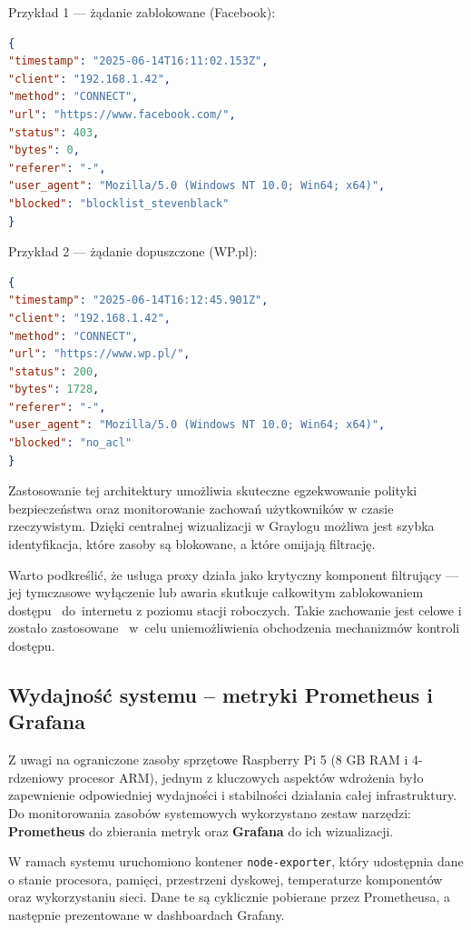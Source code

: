 \documentclass[
    left=2.5cm,         %
    right=2.5cm,        %
    top=2.5cm,          %
    bottom=3cm,         %
    bindingoffset=6mm,  %
    nohyphenation=true %
]{eiti/eiti-thesis} %
\begin{document}
Przykład 1 — żądanie zablokowane (Facebook):
\begin{lstlisting}[language=json, caption={Zablokowane żądanie HTTPS do Facebooka – dopasowane do reguły}, label={lst:squid-facebook-block}]
{
"timestamp": "2025-06-14T16:11:02.153Z",
"client": "192.168.1.42",
"method": "CONNECT",
"url": "https://www.facebook.com/",
"status": 403,
"bytes": 0,
"referer": "-",
"user_agent": "Mozilla/5.0 (Windows NT 10.0; Win64; x64)",
"blocked": "blocklist_stevenblack"
}
\end{lstlisting}

\newpage
Przykład 2 — żądanie dopuszczone (WP.pl):
\begin{lstlisting}[language=json, caption={Dostępne żądanie do portalu informacyjnego \texttt{wp.pl} – brak dopasowania ~do~ACL}, label={lst:squid-wp-noacl}]
{
"timestamp": "2025-06-14T16:12:45.901Z",
"client": "192.168.1.42",
"method": "CONNECT",
"url": "https://www.wp.pl/",
"status": 200,
"bytes": 1728,
"referer": "-",
"user_agent": "Mozilla/5.0 (Windows NT 10.0; Win64; x64)",
"blocked": "no_acl"
}
\end{lstlisting}

Zastosowanie tej architektury umożliwia skuteczne egzekwowanie polityki bezpieczeństwa oraz monitorowanie zachowań użytkowników w czasie rzeczywistym. 
Dzięki centralnej wizualizacji w Graylogu możliwa jest szybka identyfikacja, które zasoby są blokowane, a które omijają filtrację.

Warto podkreślić, że usługa proxy działa jako krytyczny komponent filtrujący — jej tymczasowe wyłączenie lub awaria skutkuje całkowitym zablokowaniem dostępu 
~do~internetu z poziomu stacji roboczych. Takie zachowanie jest celowe i zostało zastosowane ~w~celu uniemożliwienia obchodzenia mechanizmów kontroli dostępu.

\subsection{Wydajność systemu – metryki Prometheus i Grafana}

Z uwagi na ograniczone zasoby sprzętowe Raspberry Pi 5 (8 GB RAM i 4-rdzeniowy procesor ARM), jednym z kluczowych aspektów wdrożenia było zapewnienie odpowiedniej wydajności i stabilności działania całej infrastruktury. Do monitorowania zasobów systemowych wykorzystano zestaw narzędzi: \textbf{Prometheus} do zbierania metryk oraz \textbf{Grafana} do ich wizualizacji.

W ramach systemu uruchomiono kontener \texttt{node-exporter}, który udostępnia dane o stanie procesora, pamięci, przestrzeni dyskowej, temperaturze komponentów oraz wykorzystaniu sieci. Dane te są cyklicznie pobierane przez Prometheusa, a następnie prezentowane w dashboardach Grafany.
\end{document}
